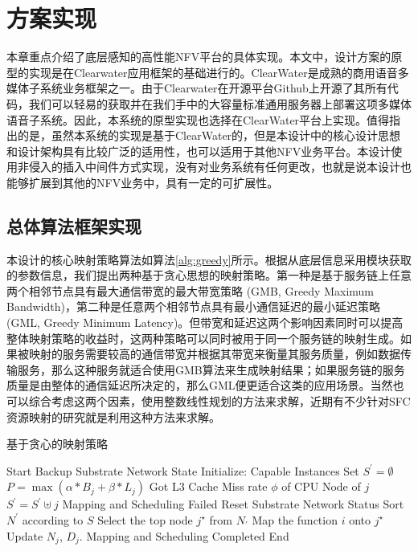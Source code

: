 \chapter{方案实现}
\label{chapter:implement}
本章重点介绍了底层感知的高性能NFV平台的具体实现。本文中，设计方案的原型的实现是在Clearwater应用框架的基础进行的。ClearWater是成熟的商用语音多媒体子系统业务框架之一。由于Clearwater在开源平台Github上开源了其所有代码，我们可以轻易的获取并在我们手中的大容量标准通用服务器上部署这项多媒体语音子系统。因此，本系统的原型实现也选择在ClearWater平台上实现。值得指出的是，虽然本系统的实现是基于ClearWater的，但是本设计中的核心设计思想和设计架构具有比较广泛的适用性，也可以适用于其他NFV业务平台。本设计使用非侵入的插入中间件方式实现，没有对业务系统有任何更改，也就是说本设计也能够扩展到其他的NFV业务中，具有一定的可扩展性。
\section{总体算法框架实现}
本设计的核心映射策略算法如算法\ref{alg:greedy}所示。根据从底层信息采用模块获取的参数信息，我们提出两种基于贪心思想的映射策略。第一种是基于服务链上任意两个相邻节点具有最大通信带宽的最大带宽策略 (GMB, Greedy Maximum Bandwidth)，第二种是任意两个相邻节点具有最小通信延迟的最小延迟策略 (GML, Greedy Minimum Latency)。但带宽和延迟这两个影响因素同时可以提高整体映射策略的收益时，这两种策略可以同时被用于同一个服务链的映射生成。如果被映射的服务需要较高的通信带宽并根据其带宽来衡量其服务质量，例如数据传输服务，那么这种服务就适合使用GMB算法来生成映射结果；如果服务链的服务质量是由整体的通信延迟所决定的，那么GML便更适合这类的应用场景。当然也可以综合考虑这两个因素，使用整数线性规划的方法来求解，近期有不少针对SFC资源映射的研究就是利用这种方法来求解。
\begin{algorithm} 
	\caption{基于贪心的映射策略}  
	\label{alg:greedy}  
	\begin{algorithmic} [1]
		\State Start
		\State Backup Substrate Network State
		\State Initialize: Capable Instances Set $S^{\prime} = \emptyset$
		\State	$P = \max(\alpha*B_{j} + \beta*L_{j})$
		\State Got L3 Cache Miss rate $\phi$ of CPU Node of $j$
		\State $S^{\prime} = S^{\prime}\uplus j $
		\EndIf			
		\EndFor					
		\State Mapping and Scheduling Failed
		\State Reset Substrate Network Status
		\Return
		\EndIf
		\State Sort $N^{\prime}$ according to $S$	
		\State Select the top node $j^{\star}$ from $N_{\prime}$
		\State Map the function $i$ onto  $j^{\star}$
		\State Update $N_{j}$, $D_{j}$.
		\EndFor
		\State Mapping and Scheduling Completed
		\State End
	\end{algorithmic}  
\end{algorithm} 
